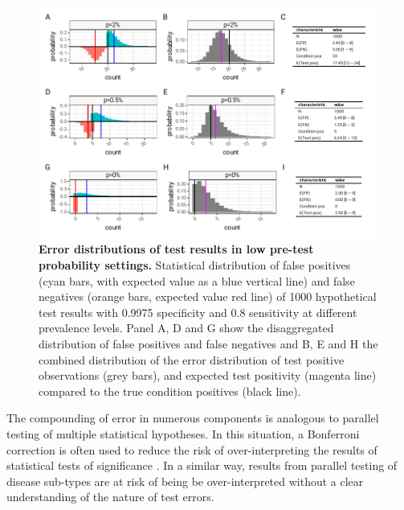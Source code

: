 \documentclass[10pt,letterpaper]{article}
\begin{document}
\begin{figure}[h!]
\centerline{\includegraphics{fig/low-prevalence-sensitivity-specificity.pdf}}
\caption{{\bf Error distributions of test results in low pre-test probability settings.}
Statistical distribution of false positives (cyan bars, with expected value as a blue vertical line) and false negatives (orange bars, expected value red line) of 1000 hypothetical test results with 0.9975 specificity and 0.8 sensitivity at different prevalence levels. Panel A, D and G show the disaggregated distribution of false positives and false negatives and B, E and H the combined distribution of the error distribution of test positive observations (grey bars), and expected test positivity (magenta line) compared to the true condition positives (black line).}
\label{fig2}
\end{figure}


The compounding of error in numerous components is analogous to parallel testing of multiple statistical hypotheses. In this situation, a Bonferroni correction is often used to reduce the risk of over-interpreting the results of statistical tests of significance \cite{shaffer1995}. In a similar way, results from parallel testing of disease sub-types are at risk of being be over-interpreted without a clear understanding of the nature of test errors.
\end{document}
